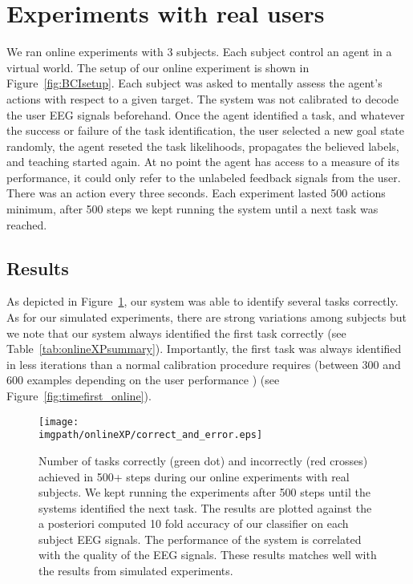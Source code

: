 \section{Experiments with real users}

We ran online experiments with 3 subjects. Each subject control an agent in a virtual world. The setup of our online experiment is shown in Figure~\ref{fig:BCIsetup}. Each subject was asked to mentally assess the agent's actions with respect to a given target. The system was not calibrated to decode the user EEG signals beforehand. Once the agent identified a task, and whatever the success or failure of the task identification, the user selected a new goal state randomly, the agent reseted the task likelihoods, propagates the believed labels, and teaching started again. At no point the agent has access to a measure of its performance, it could only refer to the unlabeled feedback signals from the user. There was an action every three seconds. Each experiment lasted 500 actions minimum, after 500 steps we kept running the system until a next task was reached.

\subsection*{Results} As depicted in Figure~\ref{fig:correcterror_online}, our system was able to identify several tasks correctly. As for our simulated experiments, there are strong variations among subjects but we note that our system always identified the first task correctly (see Table~\ref{tab:onlineXPsummary}). Importantly, the first task was always identified in less iterations than a normal calibration procedure requires (between 300 and 600 examples depending on the user performance \cite{chavarriaga2010learning,iturrate2010single}) (see Figure~\ref{fig:timefirst_online}).


\begin{figure}[!htbp]
\centering
\texttt{[image: \\imgpath/onlineXP/correct\_and\_error.eps]}
\caption{Number of tasks correctly (green dot) and incorrectly (red crosses) achieved in 500+ steps during our online experiments with real subjects. We kept running the experiments after 500 steps until the systems identified the next task. The results are plotted against the a posteriori computed 10 fold accuracy of our classifier on each subject EEG signals. The performance of the system is correlated with the quality of the EEG signals. These results matches well with the results from simulated experiments.}
\label{fig:correcterror_online}
\end{figure} 


